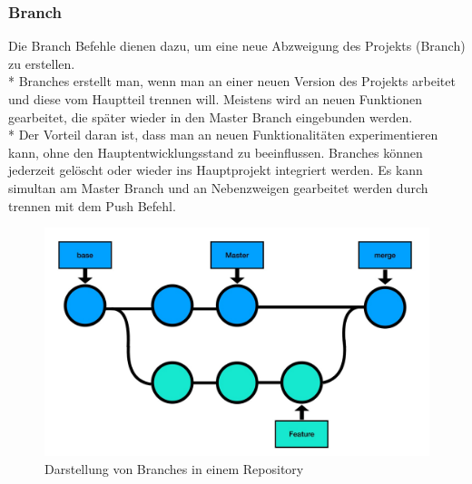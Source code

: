 \subsubsection{Branch}
\label{sec:Branch}
Die Branch Befehle dienen dazu, um eine neue Abzweigung des Projekts (Branch) zu erstellen.
\\*
Branches erstellt man, wenn man an einer neuen Version des Projekts arbeitet und diese vom Hauptteil trennen will.
Meistens wird an neuen Funktionen gearbeitet, die später wieder in den Master Branch eingebunden werden.
\\* Der Vorteil daran ist, dass man an neuen Funktionalitäten experimentieren kann, ohne den Hauptentwicklungsstand zu 
beeinflussen. Branches können jederzeit gelöscht oder wieder ins Hauptprojekt integriert werden.
Es kann simultan am Master Branch und an Nebenzweigen gearbeitet werden durch trennen mit dem Push Befehl. \cite{GitExpl}

\begin{figure}[htp]
    \author{David Ignjatovic}
    \centering
    \includegraphics[scale=0.3]{pics/GitBranches.jpg}
    \caption{Darstellung von Branches in einem Repository}
    \label{fig:impl:GitBranches}
\end{figure}

